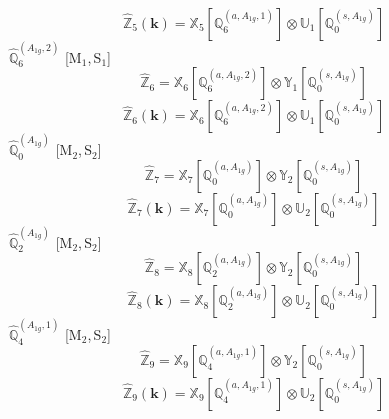 \documentclass[fleqn,10pt,landscape]{article}
\begin{document}
\begin{itemize}
\begin{dmath*}
\end{dmath*}
\begin{dmath*}
\hat{\mathbb{Z}}_{5}(\bm{k})=\mathbb{X}_{5}[\mathbb{Q}_{6}^{(a,A_{1g},1)}] \otimes\mathbb{U}_{1}[\mathbb{Q}_{0}^{(s,A_{1g})}]
\end{dmath*}
\vspace{4mm}
\noindent {} $\,\,\,\hat{\mathbb{Q}}_{6}^{(A_{1g},2)}$ [M$_{1}$,\,S$_{1}$]
\begin{dmath*}
\hat{\mathbb{Z}}_{6}=\mathbb{X}_{6}[\mathbb{Q}_{6}^{(a,A_{1g},2)}] \otimes\mathbb{Y}_{1}[\mathbb{Q}_{0}^{(s,A_{1g})}]
\end{dmath*}
\begin{dmath*}
\hat{\mathbb{Z}}_{6}(\bm{k})=\mathbb{X}_{6}[\mathbb{Q}_{6}^{(a,A_{1g},2)}] \otimes\mathbb{U}_{1}[\mathbb{Q}_{0}^{(s,A_{1g})}]
\end{dmath*}
\vspace{4mm}
\noindent {} $\,\,\,\hat{\mathbb{Q}}_{0}^{(A_{1g})}$ [M$_{2}$,\,S$_{2}$]
\begin{dmath*}
\hat{\mathbb{Z}}_{7}=\mathbb{X}_{7}[\mathbb{Q}_{0}^{(a,A_{1g})}] \otimes\mathbb{Y}_{2}[\mathbb{Q}_{0}^{(s,A_{1g})}]
\end{dmath*}
\begin{dmath*}
\hat{\mathbb{Z}}_{7}(\bm{k})=\mathbb{X}_{7}[\mathbb{Q}_{0}^{(a,A_{1g})}] \otimes\mathbb{U}_{2}[\mathbb{Q}_{0}^{(s,A_{1g})}]
\end{dmath*}
\vspace{4mm}
\noindent {} $\,\,\,\hat{\mathbb{Q}}_{2}^{(A_{1g})}$ [M$_{2}$,\,S$_{2}$]
\begin{dmath*}
\hat{\mathbb{Z}}_{8}=\mathbb{X}_{8}[\mathbb{Q}_{2}^{(a,A_{1g})}] \otimes\mathbb{Y}_{2}[\mathbb{Q}_{0}^{(s,A_{1g})}]
\end{dmath*}
\begin{dmath*}
\hat{\mathbb{Z}}_{8}(\bm{k})=\mathbb{X}_{8}[\mathbb{Q}_{2}^{(a,A_{1g})}] \otimes\mathbb{U}_{2}[\mathbb{Q}_{0}^{(s,A_{1g})}]
\end{dmath*}
\vspace{4mm}
\noindent {} $\,\,\,\hat{\mathbb{Q}}_{4}^{(A_{1g},1)}$ [M$_{2}$,\,S$_{2}$]
\begin{dmath*}
\hat{\mathbb{Z}}_{9}=\mathbb{X}_{9}[\mathbb{Q}_{4}^{(a,A_{1g},1)}] \otimes\mathbb{Y}_{2}[\mathbb{Q}_{0}^{(s,A_{1g})}]
\end{dmath*}
\begin{dmath*}
\hat{\mathbb{Z}}_{9}(\bm{k})=\mathbb{X}_{9}[\mathbb{Q}_{4}^{(a,A_{1g},1)}] \otimes\mathbb{U}_{2}[\mathbb{Q}_{0}^{(s,A_{1g})}]

\end{dmath*}
\end{itemize}
\end{document}
